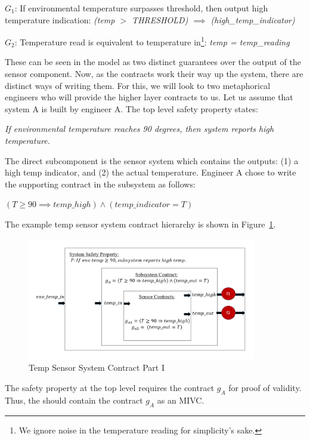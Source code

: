 $G_1$: If environmental temperature surpasses threshold, then output high temperature indication: \textit{(temp $>$ THRESHOLD) $\implies$ (high\_temp\_indicator)}

$G_2$: Temperature read is equivalent to temperature in\footnote{We ignore noise in the temperature reading for simplicity's sake.}: \textit{temp = temp\_reading} 


These can be seen in the model as two distinct guarantees over the output of the sensor component. Now, as the contracts work their way up the system, there are distinct ways of writing them. For this, we will look to two metaphorical engineers who will provide the higher layer contracts to us. Let us assume that system A is built by engineer A. The top level safety property states: 
\begin{center}
    \textit{If environmental temperature reaches 90 degrees, then system reports high temperature.}
\end{center}

The direct subcomponent is the sensor system which contains the outputs: (1) a high temp indicator, and (2) the actual temperature. Engineer A chose to write the supporting contract in the subsystem as follows: 
\begin{center}
    $(T \geq 90 \implies temp\_high) \land (temp\_indicator = T)$ 
\end{center}
  
The example temp sensor system contract hierarchy is shown in Figure~\ref{fig:granularityEx1}.  

\begin{figure}[h!]
\begin{center}
\includegraphics[width=10cm]{images/granularityEx.PNG}
\caption{Temp Sensor System Contract Part I} \label{fig:granularityEx1}
\end{center}
\end{figure}

The safety property at the top level requires the contract $g_A$ for proof of validity. Thus, the \aivcalg should contain the contract $g_A$ as an MIVC. 

